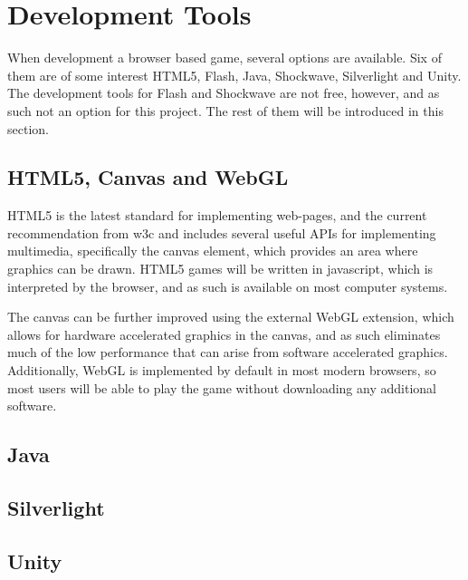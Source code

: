 \section{Development Tools}

\label{sec:tools}

When development a browser based game, several options are available. Six of them are of some interest
HTML5, Flash, Java, Shockwave, Silverlight and Unity. The development tools for Flash and Shockwave are not free\cite{adobe13}, however,
and as such not an option for this project. The rest of them will be introduced in this section.

\subsection{HTML5, Canvas and WebGL}
HTML5 is the latest standard for implementing web-pages, and the current recommendation from \ac{w3c}\cite{html513} and includes several
useful APIs for implementing multimedia, specifically the canvas element, which provides an area where graphics can be drawn.
HTML5 games will be written in javascript, which is interpreted by the browser, and as such is available on most computer systems.

The canvas can be further improved using the external WebGL extension\cite{khronos13}, which allows for hardware accelerated graphics in the canvas,
and as such eliminates much of the low performance that can arise from software accelerated graphics.
Additionally, WebGL is implemented by default in most modern browsers, so most users will be able to play the game
without downloading any additional software.

\subsection{Java}

\subsection{Silverlight}

\subsection{Unity}